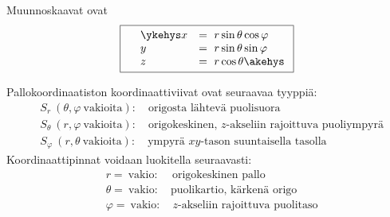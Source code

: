 Muunnoskaavat ovat
\[
\boxed{\quad
\begin{array}{ll}
\ykehys x &= \ r \sin{\theta} \cos{\varphi} \quad \\
        y &= \ r \sin{\theta} \sin{\varphi} \\
        z &= \ r \cos{\theta} \akehys
\end{array}
}
\]

Pallokoordinaatiston koordinaattiviivat ovat seuraavaa tyyppiä:
\begin{align*}
&S_r\ (\theta,\varphi\ \text{vakioita}): \quad \text{origosta lähtevä puolisuora} \\
&S_\theta\ (r,\varphi\ \text{vakioita}):  \quad \text{origokeskinen, $z$-akseliin rajoittuva
                                                                              puoliympyrä} \\
&S_\varphi\ (r,\theta\ \text{vakioita}): \quad \text{ympyrä $xy$-tason suuntaisella tasolla}
\end{align*}
Koordinaattipinnat voidaan luokitella seuraavasti:
\begin{align*}
&r=\ \text{vakio}:       \quad\, \text{origokeskinen pallo} \\
&\theta=\ \text{vakio}:  \quad   \text{puolikartio, kärkenä origo} \\
&\varphi=\ \text{vakio}: \quad   \text{$z$-akseliin rajoittuva puolitaso}
\end{align*}

